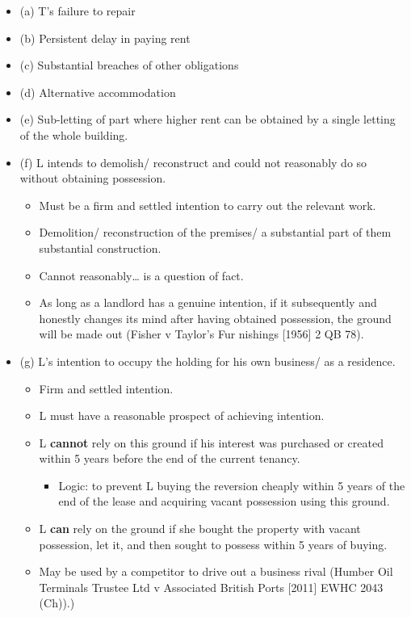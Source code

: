 \documentclass[
]{article}
\providecommand{\tightlist}{%
  \setlength{\itemsep}{0pt}\setlength{\parskip}{0pt}}
\begin{document}
\begin{itemize}
\tightlist
\item
  (a) T's failure to repair
\item
  (b) Persistent delay in paying rent
\item
  (c) Substantial breaches of other obligations
\item
  (d) Alternative accommodation
\item
  (e) Sub-letting of part where higher rent can be obtained by a single
  letting of the whole building.
\item
  (f) L intends to demolish/ reconstruct and could not reasonably do so
  without obtaining possession.

  \begin{itemize}
  \tightlist
  \item
    Must be a firm and settled intention to carry out the relevant work.
  \item
    Demolition/ reconstruction of the premises/ a substantial part of
    them substantial construction.
  \item
    Cannot reasonably\ldots{} is a question of fact.
  \item
    As long as a landlord has a genuine intention, if it subsequently
    and honestly changes its mind after having obtained possession, the
    ground will be made out (Fisher v Taylor's Fur nishings {[}1956{]} 2
    QB 78).
  \end{itemize}
\item
  (g) L's intention to occupy the holding for his own business/ as a
  residence.

  \begin{itemize}
  \tightlist
  \item
    Firm and settled intention.
  \item
    L must have a reasonable prospect of achieving intention.
  \item
    L \textbf{cannot} rely on this ground if his interest was purchased
    or created within 5 years before the end of the current tenancy.

    \begin{itemize}
    \tightlist
    \item
      Logic: to prevent L buying the reversion cheaply within 5 years of
      the end of the lease and acquiring vacant possession using this
      ground.
    \end{itemize}
  \item
    L \textbf{can} rely on the ground if she bought the property with
    vacant possession, let it, and then sought to possess within 5 years
    of buying.
  \item
    May be used by a competitor to drive out a business rival (Humber
    Oil Terminals Trustee Ltd v Associated British Ports {[}2011{]} EWHC
    2043 (Ch)).)
  \end{itemize}
\end{itemize}
\end{document}
